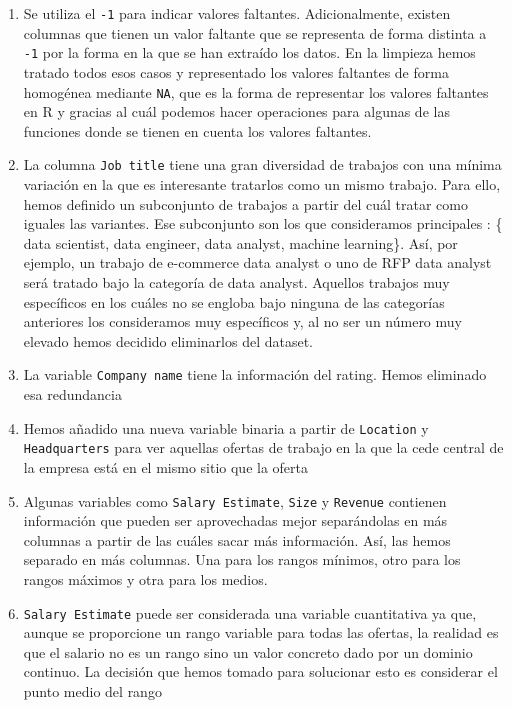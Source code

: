 \documentclass[
]{article}
\begin{document}
\begin{enumerate}
\def\labelenumi{\arabic{enumi}.}
\item
  Se utiliza el \texttt{-1} para indicar valores faltantes.
  Adicionalmente, existen columnas que tienen un valor faltante que se
  representa de forma distinta a \texttt{-1} por la forma en la que se
  han extraído los datos. En la limpieza hemos tratado todos esos casos
  y representado los valores faltantes de forma homogénea mediante
  \texttt{NA}, que es la forma de representar los valores faltantes en R
  y gracias al cuál podemos hacer operaciones para algunas de las
  funciones donde se tienen en cuenta los valores faltantes.
\item
  La columna \texttt{Job\ title} tiene una gran diversidad de trabajos
  con una mínima variación en la que es interesante tratarlos como un
  mismo trabajo. Para ello, hemos definido un subconjunto de trabajos a
  partir del cuál tratar como iguales las variantes. Ese subconjunto son
  los que consideramos principales : \{ data scientist, data engineer,
  data analyst, machine learning\}. Así, por ejemplo, un trabajo de
  e-commerce data analyst o uno de RFP data analyst será tratado bajo la
  categoría de data analyst. Aquellos trabajos muy específicos en los
  cuáles no se engloba bajo ninguna de las categorías anteriores los
  consideramos muy específicos y, al no ser un número muy elevado hemos
  decidido eliminarlos del dataset.
\item
  La variable \texttt{Company\ name} tiene la información del rating.
  Hemos eliminado esa redundancia
\item
  Hemos añadido una nueva variable binaria a partir de \texttt{Location}
  y \texttt{Headquarters} para ver aquellas ofertas de trabajo en la que
  la cede central de la empresa está en el mismo sitio que la oferta
\item
  Algunas variables como \texttt{Salary\ Estimate}, \texttt{Size} y
  \texttt{Revenue} contienen información que pueden ser aprovechadas
  mejor separándolas en más columnas a partir de las cuáles sacar más
  información. Así, las hemos separado en más columnas. Una para los
  rangos mínimos, otro para los rangos máximos y otra para los medios.
\item
  \texttt{Salary\ Estimate} puede ser considerada una variable
  cuantitativa ya que, aunque se proporcione un rango variable para
  todas las ofertas, la realidad es que el salario no es un rango sino
  un valor concreto dado por un dominio continuo. La decisión que hemos
  tomado para solucionar esto es considerar el punto medio del rango

\end{enumerate}
\end{document}
